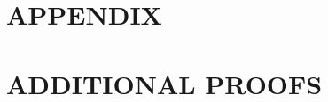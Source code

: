 \documentclass[12pt,reqno,oneside]{pucthesis}
\begin{document}




{\setlength{\baselineskip}{0.8\baselineskip}
% 
\par}


\newif\ifappendix
\appendixtrue
\ifappendix
\appendix
\clearpage
\begingroup%
\makeatletter%
\let\clearpage\relax%
\vspace*{\fill}%
\vspace*{\dimexpr-50\p@-\baselineskip}%
\chapter*{APPENDIX}
\vspace*{\fill}%
\endgroup

\chapter{ADDITIONAL PROOFS}


\fi




\end{document}
